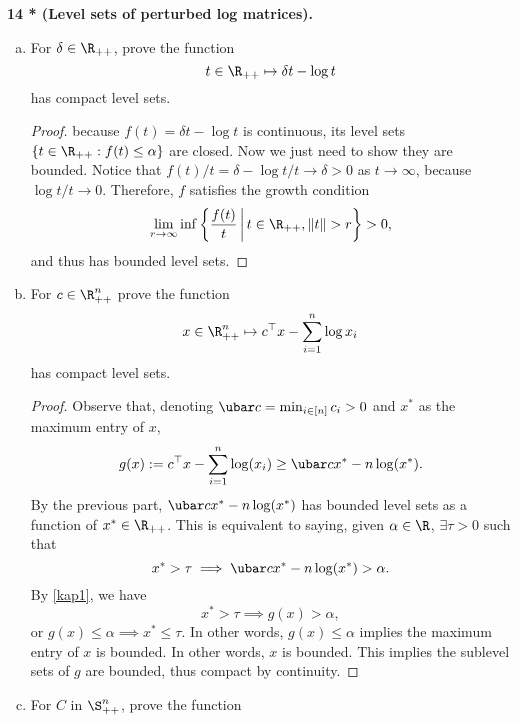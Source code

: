 \documentclass[../borwein-lewis_notes.tex]{subfiles}
\begin{document}
\noindent \textbf{14 * (Level sets of perturbed log matrices).} 
\begin{enumerate}[(a)]
\item For $\delta\in\R_{++}$, prove the function 
\begin{equation*}
t\in\R_{++}\mapsto \delta t-\log t
\end{equation*}
has compact level sets.
\begin{proof}
because $f(t) = \delta t-\log t$ is continuous, its level sets 
$\{t\in\R_{++}:f(t)\leq \alpha\}$ are closed. Now we just need to show 
they are bounded. Notice that $f(t)/t = \delta-\log t/t \to \delta > 0$ 
as $t\to\infty$, because $\log t/t\to 0$. Therefore, $f$ satisfies 
the growth condition
\begin{equation*}
\lim_{r\to\infty} \inf\left\{\frac{f(t)}{t}\,\bigg|\, t\in \R_{++},
\|t\| > r\right\} > 0,
\end{equation*}
and thus has bounded level sets.
\end{proof}
\item For $c\in\R_{++}^n$ prove the function 
\begin{equation*}
x\in\R_{++}^n \mapsto c^\top x - \sum_{i=1}^n  \log x_i
\end{equation*}
has compact level sets. 
\begin{proof}
Observe that, denoting $\ubar c = \min_{i\in[n]}c_i>0$ and 
$x^*$ as the maximum entry of $x$,
\begin{equation}
\label{kap1}
g(x) : = c^\top x - \sum_{i=1}^n \log(x_i) \geq \ubar cx^* - n\log(x^*).
\end{equation}
By the previous part, $\ubar cx^* -  n\log(x^*)$ has bounded level sets 
as a function of $x^*\in\R_{++}$. This is equivalent to saying,
 given $\alpha\in\R$, $\exists \tau >0$ such that 
\begin{equation*}
x^*>\tau \implies \ubar cx^*-n\log(x^*) > \alpha.
\end{equation*}
By \eqref{kap1}, we have 
\begin{equation*}
x^* > \tau \implies g(x) > \alpha,
\end{equation*}
or $g(x)\leq\alpha\implies x^*\leq \tau$. In other words, $g(x)\leq\alpha$
implies the maximum entry of $x$ is bounded. In other words, $x$ is 
bounded. This implies the sublevel sets of $g$ are bounded, thus compact
by continuity.
\end{proof}
\item For $C$ in $\S_{++}^n$, prove the function 
\begin{equation*}

\end{equation*}
\end{enumerate}
\end{document}
